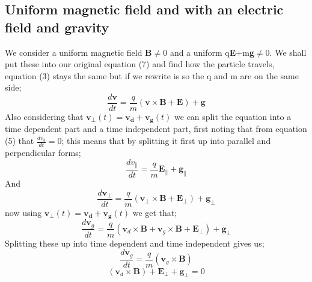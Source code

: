 \documentclass[14paper,11pt,hidelinks]{article}
\begin{document}
\subsection{Uniform magnetic field and with an electric field and gravity}
We consider a uniform magnetic field \textbf{B}\begin{math}\ne\end{math}0 and a uniform q\textbf{E}+m\textbf{g}\begin{math}\ne\end{math}0. We shall put these into our original equation (7) and find how the particle travels, equation (3) stays the same but if we rewrite is so the q and m are on the same side;
\begin{equation}
\frac{d\mathbf{v}}{dt}=\frac{q}{m}\left(\mathbf{v}\times\mathbf{B}+\mathbf{E}\right)+\mathbf{g}
\end{equation}
Also considering that \begin{math}\mathbf{v_\bot}(t)=\mathbf{v_d}+\mathbf{v_g}(t)\end{math} we can split the equation into a time dependent part and a time independent part, first noting that from equation (5) that \begin{math}\frac{dv_3}{dt}=0\end{math}; this means that by splitting it first up into parallel and perpendicular forms;
\begin{equation}
\frac{dv_\parallel}{dt}=\frac{q}{m}\mathbf{E}_\parallel+\mathbf{g}_\parallel
\end{equation}
And
\begin{equation}
\frac{d\mathbf{v}_\bot}{dt}=\frac{q}{m}\left(\mathbf{v}_\bot\times\mathbf{B}+\mathbf{E}_\bot\right)+\mathbf{g}_\bot
\end{equation}
now using \begin{math}\mathbf{v_\bot}(t)=\mathbf{v_d}+\mathbf{v_g}(t)\end{math} we get that;
\begin{equation}
\frac{d\mathbf{v}_g}{dt}=\frac{q}{m}\left(\mathbf{v}_d\times\mathbf{B}+\mathbf{v}_g\times\mathbf{B}+\mathbf{E}_\bot\right)+\mathbf{g}_\bot
\end{equation}
Splitting these up into time dependent and time independent gives us;
\begin{equation}
\frac{d\mathbf{v}_g}{dt}=\frac{q}{m}\left(\mathbf{v}_g\times\mathbf{B}\right)
\end{equation}
\begin{equation}
\left(\mathbf{v}_d\times\mathbf{B}\right)+\mathbf{E}_\bot+\mathbf{g}_\bot=0
\end{equation}
\end{document}
